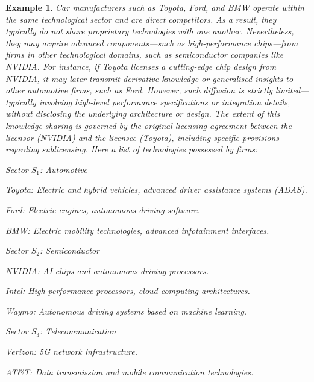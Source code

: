\documentclass[preprint,11pt,authoryear]{elsarticle}
\theoremstyle{plain}
\newtheorem{example}[theorem]{Example}
\begin{document}
\begin{example}\label{ex:threeU}
Car manufacturers such as Toyota, Ford, and BMW operate within the same technological sector and are direct competitors. As a result, they typically do not share proprietary technologies with one another. Nevertheless, they may acquire advanced components—such as high-performance chips—from firms in other technological domains, such as semiconductor companies like NVIDIA.
For instance, if Toyota licenses a cutting-edge chip design from NVIDIA, it may later transmit derivative knowledge or generalised insights to other automotive firms, such as Ford. However, such diffusion is strictly limited—typically involving high-level performance specifications or integration details, without disclosing the underlying architecture or design. The extent of this knowledge sharing is governed by the original licensing agreement between the licensor (NVIDIA) and the licensee (Toyota), including specific provisions regarding sublicensing. Here a list of technologies possessed by firms:
\begin{description}
    \item \textit{Sector $S_1$: Automotive}
    \begin{description}
        \item Toyota: Electric and hybrid vehicles, advanced driver assistance systems (ADAS).
        \item Ford: Electric engines, autonomous driving software.
        \item BMW: Electric mobility technologies, advanced infotainment interfaces.
    \end{description}
    \item \textit{Sector $S_2$: Semiconductor}
    \begin{description}
        \item NVIDIA: AI chips and autonomous driving processors.
        \item Intel: High-performance processors, cloud computing architectures.
        \item Waymo: Autonomous driving systems based on machine learning.
    \end{description}
    \item \textit{Sector $S_3$: Telecommunication}
    \begin{description}
        \item Verizon: 5G network infrastructure.
        \item AT\&T: Data transmission and mobile communication technologies.

\end{description}
\end{description}
\end{example}
\end{document}
